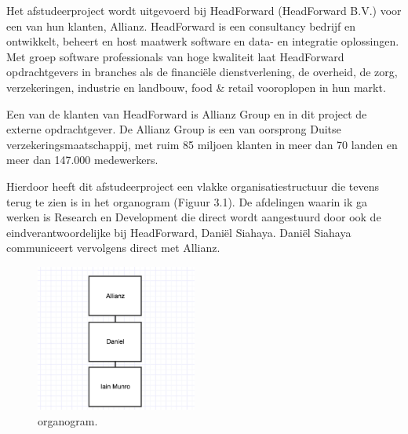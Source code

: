 Het afstudeerproject wordt uitgevoerd bij HeadForward (HeadForward B.V.) voor een van hun klanten, Allianz. HeadForward is een consultancy bedrijf en ontwikkelt, beheert en host maatwerk software en data- en integratie oplossingen. Met groep software professionals van hoge kwaliteit laat HeadForward opdrachtgevers in branches als de financiële dienstverlening, de overheid, de zorg, verzekeringen, industrie en landbouw, food \& retail vooroplopen in hun markt. 

Een van de klanten van HeadForward is Allianz Group en in dit project de externe opdrachtgever. De Allianz Group is een van oorsprong Duitse verzekeringsmaatschappij, met ruim 85 miljoen klanten in meer dan 70 landen en meer dan 147.000 medewerkers. 

Hierdoor heeft dit afstudeerproject een vlakke organisatiestructuur die tevens terug te zien is in het organogram (Figuur 3.1). De afdelingen waarin ik ga werken is Research en Development die direct wordt aangestuurd door ook de eindverantwoordelijke bij HeadForward, Dani\"el Siahaya. Dani\"el Siahaya communiceert vervolgens direct met Allianz.

\begin{figure}[ht]
    \begin{center}
        \includegraphics[width=200px]{images/org.png}
        \caption{organogram.}
    \end{center}
\end{figure}